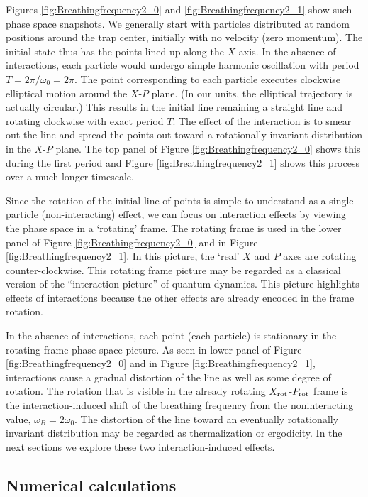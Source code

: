 \documentclass[onecolumn,pra]{revtex4-1}
\begin{document}
Figures \ref{fig:Breathingfrequency2_0} and \ref{fig:Breathingfrequency2_1} show such phase space
snapshots.  We generally start with particles distributed at random positions around the trap
center, initially with no velocity (zero momentum).  The initial state thus has the points lined up
along the $X$ axis.  In the absence of interactions, each particle would undergo simple harmonic
oscillation with period $T=2\pi/\omega_0 = 2\pi$.  The point corresponding to each particle executes
clockwise elliptical motion around the $X$-$P$ plane.  (In our units, the elliptical trajectory is
actually circular.)  This results in the initial line remaining a straight line and rotating
clockwise with exact period $T$.  The effect of the interaction is to smear out the line and spread
the points out toward a rotationally invariant distribution in the $X$-$P$ plane.  The top panel of
Figure \ref{fig:Breathingfrequency2_0} shows this during the first period and Figure
\ref{fig:Breathingfrequency2_1} shows this process over a much longer timescale.

Since the rotation of the initial line of points is simple to understand as a single-particle
(non-interacting) effect, we can focus on interaction effects by viewing the phase space in a
`rotating' frame.  The rotating frame is used in the lower panel of Figure
\ref{fig:Breathingfrequency2_0} and in Figure \ref{fig:Breathingfrequency2_1}.  In this picture, the
`real' $X$ and $P$ axes are rotating counter-clockwise.  This rotating frame picture may be regarded
as a classical version of the ``interaction picture'' of quantum dynamics.  This picture highlights
effects of interactions because the other effects are already encoded in the frame rotation.

In the absence of interactions, each point (each particle) is stationary in the rotating-frame
phase-space picture.  As seen in lower panel of Figure \ref{fig:Breathingfrequency2_0} and in Figure
\ref{fig:Breathingfrequency2_1}, interactions cause a gradual distortion of the line as well as some
degree of rotation.
%
The rotation that is visible in the already rotating $X_{\rm rot}$-$P_{\rm rot}$ frame is the
interaction-induced shift of the breathing frequency from the noninteracting value,
$\omega_B=2\omega_0$.  The distortion of the line toward an eventually rotationally invariant
distribution may be regarded as thermalization or ergodicity.  In the next sections we explore these
two interaction-induced effects.




\subsection{Numerical calculations}
\end{document}
